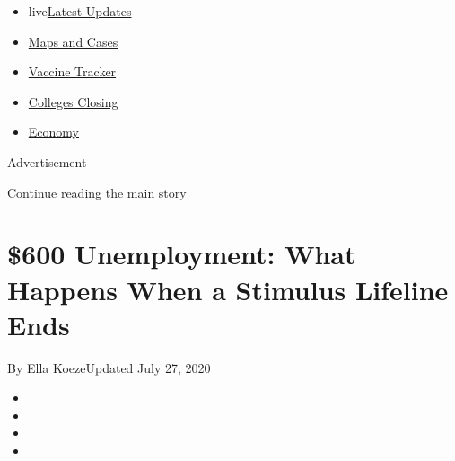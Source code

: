 \begin{itemize}
\tightlist
\item
  live\href{https://www.nytimes3xbfgragh.onion/2020/08/21/world/covid-19-coronavirus.html?name=styln-coronavirus-national\&region=TOP_BANNER\&variant=undefined\&block=storyline_menu_recirc\&action=click\&pgtype=Interactive\&impression_id=8c437001-e39a-11ea-adda-c17bab336bc5}{Latest
  Updates}
\item
  \href{https://www.nytimes3xbfgragh.onion/interactive/2020/us/coronavirus-us-cases.html?name=styln-coronavirus-national\&region=TOP_BANNER\&variant=undefined\&block=storyline_menu_recirc\&action=click\&pgtype=Interactive\&impression_id=8c437002-e39a-11ea-adda-c17bab336bc5}{Maps
  and Cases}
\item
  \href{https://www.nytimes3xbfgragh.onion/interactive/2020/science/coronavirus-vaccine-tracker.html?name=styln-coronavirus-national\&region=TOP_BANNER\&variant=undefined\&block=storyline_menu_recirc\&action=click\&pgtype=Interactive\&impression_id=8c437003-e39a-11ea-adda-c17bab336bc5}{Vaccine
  Tracker}
\item
  \href{https://www.nytimes3xbfgragh.onion/2020/08/19/us/colleges-closing-covid.html?name=styln-coronavirus-national\&region=TOP_BANNER\&variant=undefined\&block=storyline_menu_recirc\&action=click\&pgtype=Interactive\&impression_id=8c437004-e39a-11ea-adda-c17bab336bc5}{Colleges
  Closing}
\item
  \href{https://www.nytimes3xbfgragh.onion/live/2020/08/20/business/stock-market-today-coronavirus?name=styln-coronavirus-national\&region=TOP_BANNER\&variant=undefined\&block=storyline_menu_recirc\&action=click\&pgtype=Interactive\&impression_id=8c439710-e39a-11ea-adda-c17bab336bc5}{Economy}
\end{itemize}

Advertisement

\protect\hyperlink{after-top}{Continue reading the main story}

\hypertarget{600-unemployment-what-happens-when-a-stimulus-lifeline-ends}{%
\section{\$600 Unemployment: What Happens When a Stimulus Lifeline
Ends}\label{600-unemployment-what-happens-when-a-stimulus-lifeline-ends}}

By Ella KoezeUpdated July 27, 2020

\begin{itemize}
\item
\item
\item
\item
\end{itemize}

